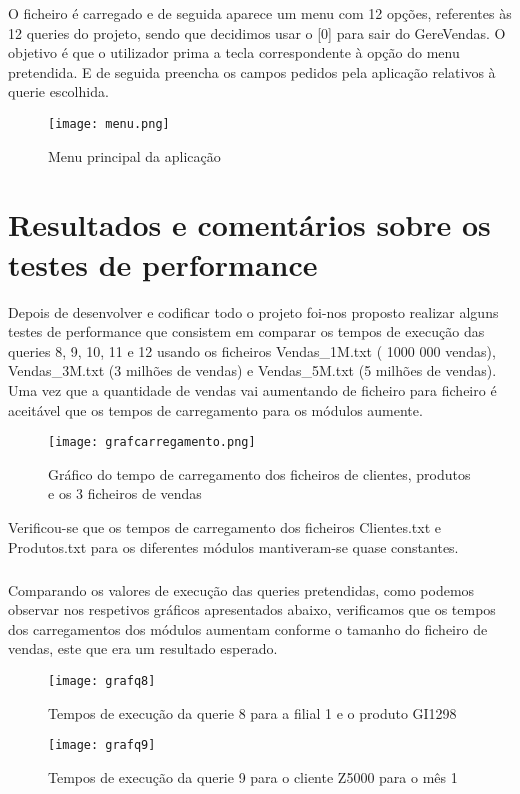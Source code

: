 O ficheiro é carregado e de seguida aparece um menu com 12 opções, referentes às 12 queries do projeto, sendo que decidimos usar o [0] para sair do GereVendas. O objetivo é que o utilizador prima a tecla correspondente à opção do menu pretendida. E de seguida preencha os campos pedidos pela aplicação relativos à querie escolhida. 

\begin{figure}[h!]
	\centering
	\texttt{[image: menu.png]}  
	\caption{Menu principal da aplicação}  
\end{figure}


\chapter{Resultados e comentários sobre os testes de performance}
Depois de desenvolver e codificar todo o projeto foi-nos proposto realizar alguns testes de performance que consistem em comparar os tempos de execução das queries 8, 9, 10, 11 e 12 usando os ficheiros Vendas\_1M.txt ( 1000 000 vendas), Vendas\_3M.txt (3 milhões de vendas) e Vendas\_5M.txt (5 milhões de vendas).
Uma vez que a quantidade de vendas vai aumentando de ficheiro para ficheiro é aceitável que os tempos de carregamento para os módulos aumente.


\begin{figure}[h!]
	\centering
	\texttt{[image: grafcarregamento.png]}  
	\caption{Gráfico do tempo de carregamento dos ficheiros de clientes, produtos e os 3 ficheiros de vendas}  
\end{figure}

Verificou-se que os tempos de carregamento dos ficheiros Clientes.txt e Produtos.txt para os diferentes módulos mantiveram-se quase constantes. 

\paragraph{}
\paragraph{}
Comparando os valores de execução das queries pretendidas, como podemos observar nos respetivos gráficos apresentados abaixo, verificamos que os tempos dos carregamentos dos módulos aumentam conforme o tamanho do ficheiro de vendas, este que era um resultado esperado. 

  	\begin{minipage}{0.45\linewidth}
  		\begin{figure}[H]
  			\texttt{[image: grafq8]}
  			\caption{Tempos de execução da querie 8 para a filial 1 e o produto GI1298}
  		\end{figure}
  	\end{minipage}
  	\hspace{0.05\linewidth}
  	\begin{minipage}{0.45\linewidth}
  		\begin{figure}[H]
  			\texttt{[image: grafq9]}
  			\caption{Tempos de execução da querie 9 para o cliente Z5000 para o mês 1}
  		\end{figure}
  	\end{minipage}
  	
